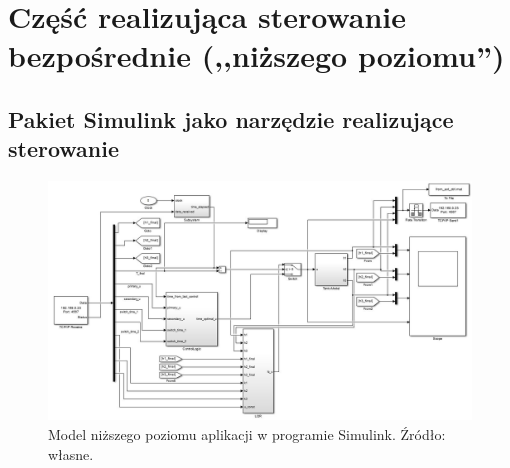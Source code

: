 \section{Część realizująca sterowanie bezpośrednie (,,niższego poziomu'')}
\label{sec:czesc-nizsza}

\subsection{Pakiet Simulink jako narzędzie realizujące sterowanie}
\label{sub:czesc-nizsza-matlab}

\cite{Trawinski2011}


\begin{figure}
    \centering
    \includegraphics[scale=0.65,angle=90]{Grafika/simulink_model}
    \caption{Model niższego poziomu aplikacji w programie Simulink. Źródło: własne.}
    \label{fig:simulinkmodel}
\end{figure}

